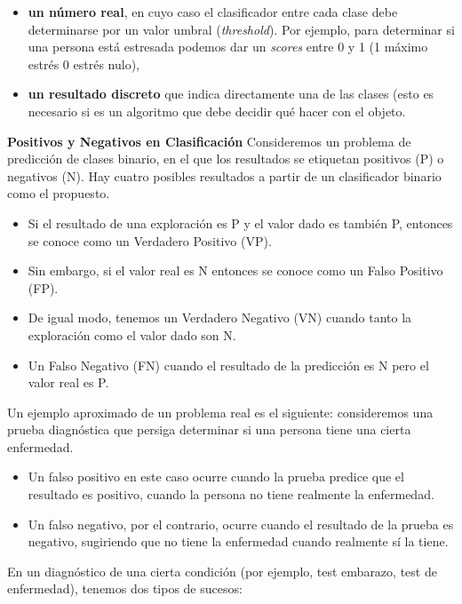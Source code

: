 \documentclass[
  letterpaper,
  DIV=11,
  numbers=noendperiod]{scrreprt}
\providecommand{\tightlist}{%
  \setlength{\itemsep}{0pt}\setlength{\parskip}{0pt}}\usepackage{longtable,booktabs,array}
\begin{document}
\begin{itemize}
\tightlist
\item
  \textbf{un número real}, en cuyo caso el clasificador entre cada clase
  debe determinarse por un valor umbral (\emph{threshold}). Por ejemplo,
  para determinar si una persona está estresada podemos dar un
  \emph{scores} entre 0 y 1 (1 máximo estrés 0 estrés nulo),
\item
  \textbf{un resultado discreto} que indica directamente una de las
  clases (esto es necesario si es un algoritmo que debe decidir qué
  hacer con el objeto.
\end{itemize}

\textbf{Positivos y Negativos en Clasificación} Consideremos un problema
de predicción de clases binario, en el que los resultados se etiquetan
positivos (P) o negativos (N). Hay cuatro posibles resultados a partir
de un clasificador binario como el propuesto.

\begin{itemize}
\tightlist
\item
  Si el resultado de una exploración es P y el valor dado es también P,
  entonces se conoce como un Verdadero Positivo (VP).
\item
  Sin embargo, si el valor real es N entonces se conoce como un Falso
  Positivo (FP).
\item
  De igual modo, tenemos un Verdadero Negativo (VN) cuando tanto la
  exploración como el valor dado son N.
\item
  Un Falso Negativo (FN) cuando el resultado de la predicción es N pero
  el valor real es P.
\end{itemize}

Un ejemplo aproximado de un problema real es el siguiente: consideremos
una prueba diagnóstica que persiga determinar si una persona tiene una
cierta enfermedad.

\begin{itemize}
\tightlist
\item
  Un falso positivo en este caso ocurre cuando la prueba predice que el
  resultado es positivo, cuando la persona no tiene realmente la
  enfermedad.
\item
  Un falso negativo, por el contrario, ocurre cuando el resultado de la
  prueba es negativo, sugiriendo que no tiene la enfermedad cuando
  realmente sí la tiene.
\end{itemize}

En un diagnóstico de una cierta condición (por ejemplo, test embarazo,
test de enfermedad), tenemos dos tipos de sucesos:
\end{document}
